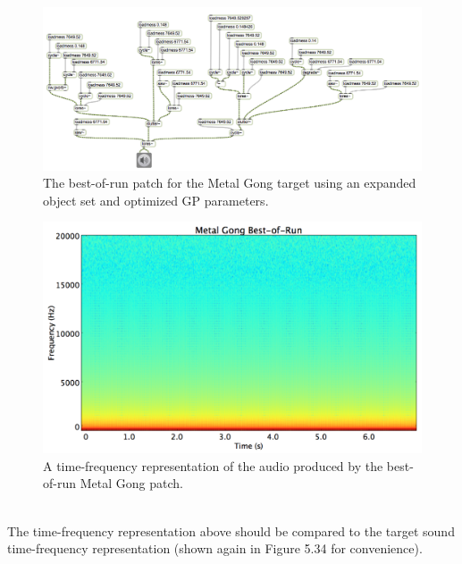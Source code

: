 \documentclass[a4paper,12pt]{report} 	%
\numberwithin{figure}{chapter}
\numberwithin{table}{chapter}
\numberwithin{equation}{chapter}
\begin{document}
\begin{flushleft}
\begin{figure}[h!]
\begin{center}
\includegraphics[angle=270, scale=0.45]{MetalGong_Best}
\caption[Metal Gong Best-of-Run Patch]{The best-of-run patch for the Metal Gong target using an expanded object set and optimized GP parameters.}
\end{center}
\end{figure}
\begin{figure}[h!]
\begin{center}
\includegraphics[scale=0.35,width=\linewidth]{MetalGongBestOfRunSTFT}
\caption[Best-of-Run Metal Gong Time-Frequency Representation]{A time-frequency representation of the audio produced by the best-of-run Metal Gong patch.}
\end{center}
\end{figure}
\\
The time-frequency representation above should be compared to the target sound time-frequency representation (shown again in Figure 5.34 for convenience).
\begin{figure}[h!]
\begin{center}

\end{center}
\end{figure}
\end{flushleft}
\end{document}
